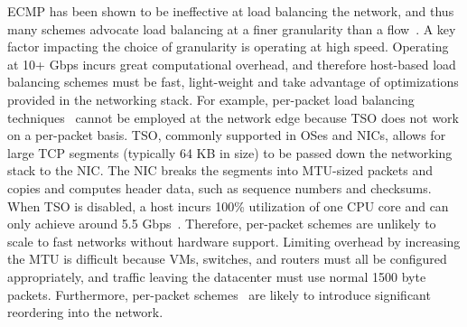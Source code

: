  ECMP has been shown to be ineffective at load balancing the network, and thus many schemes advocate load balancing at a finer granularity than a flow~\cite{drb,conga,juniper-vcf,packetspray}. A key factor impacting the choice of granularity is operating at high speed. 
Operating at 10+ Gbps incurs great computational overhead, and therefore host-based load balancing schemes
must be fast, light-weight and take advantage of optimizations provided in the networking stack.
For example, per-packet load balancing techniques~\cite{drb} cannot be
employed at the network edge because TSO does not work on a per-packet
basis. TSO, commonly supported in OSes and NICs, allows for large TCP segments (typically 64 KB in size)
to be passed down the networking stack to the NIC. The NIC breaks the segments into MTU-sized packets and copies and computes
header data, such as sequence numbers and checksums. When TSO is disabled, a host incurs 100\% utilization of one CPU core and can only achieve
around 5.5 Gbps~\cite{bullettrains}. Therefore, per-packet schemes are unlikely to scale to fast networks without hardware support.
Limiting overhead by increasing the MTU is difficult because
VMs, switches, and routers must all be configured appropriately, and traffic
leaving the datacenter must use normal 1500 byte packets. Furthermore, per-packet schemes~\cite{drb,packetspray} are likely to
introduce significant reordering into the network.



